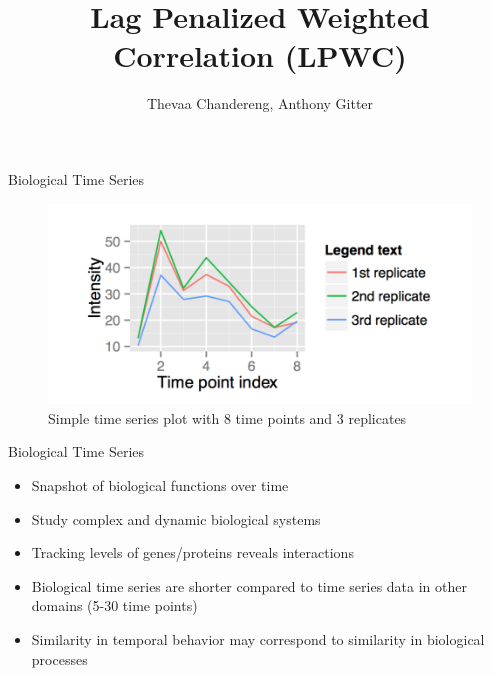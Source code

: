 \documentclass[10pt]{beamer}
\title{Lag Penalized Weighted Correlation (LPWC)}
\date{}
\author{Thevaa Chandereng, Anthony Gitter}
\begin{document}
\maketitle

\begin{frame}{Biological Time Series}

\begin{figure}
  \centering
    \includegraphics[width=1.0\textwidth]{Timeseries.png}
  \caption{Simple time series plot with 8 time points and 3 replicates}
\end{figure} 
   
\end{frame}


\begin{frame}{Biological Time Series}
    
\begin{itemize}
\item Snapshot of biological functions over time
\item Study complex and dynamic biological systems 
\item Tracking levels of genes/proteins reveals interactions
\item Biological time series are shorter compared to time series data in other domains (5-30 time points)
\item Similarity in temporal behavior may correspond to similarity in biological processes 
 \end{itemize}

\end{frame}
\end{document}
